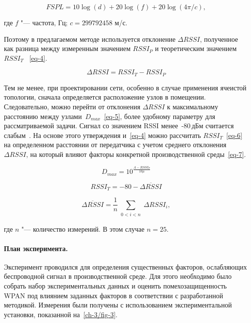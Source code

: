 \begin{equation}
	FSPL = 10 \log (d) +20 \log (f) +20 \log (4 \pi/c),
	\label{eq-3}
\end{equation}

\noindent где $f$ "--- частота, Гц; $c = 299792458$ м/с.

Поэтому в предлагаемом методе используется отклонение $\Delta RSSI$, полученное как разница между измеренным значением $RSSI_P$ и теоретическим значением $RSSI_T$~ \cref{eq-4}.

\begin{equation}
	\Delta RSSI = RSSI_T-RSSI_P
	\label{eq-4}
\end{equation}

Тем не менее, при проектировании сети, особенно в случае применения ячеистой топологии, сначала определяется расположение узлов в помещении. Следовательно, можно перейти от отклонения $\Delta RSSI$ к максимальному расстоянию между узлами~$D_{max}$~\cref{eq-5}, более удобному параметру для рассматриваемой задачи. Сигнал со значением RSSI менее~-80\,дБм считается слабым~\cite{mob_sig}. На основе этого утверждения и~\cref{eq-4} можно рассчитать $RSSI_T$~\cref{eq-6} на определенном расстоянии от передатчика с учетом среднего отклонения $\Delta RSSI$, на который влияют факторы конкретной производственной среды~\cref{eq-7}.

\begin{equation}
	D_{max} = 10^\frac{A-RSSI_T}{10 \mu}
	\label{eq-5}
\end{equation}

\begin{equation}
	RSSI_T = -80-\overline{{\mathit \Delta} RSSI}
	\label{eq-6}
\end{equation}

\begin{equation}
	\overline{{\mathit \Delta} RSSI} = \frac1n \sum_{\substack{0 < i < n}}{\mathit\Delta} RSSI_i,
	\label{eq-7}
\end{equation}

\noindent где $n$ "--- количество измерений. В этом случае $n = 25$.

\paragraph{План эксперимента.}

Эксперимент проводился для определения существенных факторов, ослабляющих беспроводной сигнал в производственной среде. Для этого необходимо было собрать набор экспериментальных данных и оценить помехозащищенность WPAN под влиянием заданных факторов в соответствии с разработанной методикой.
Измерения были получены с использованием экспериментальной установки, показанной на~\cref{ch-3/fig-3}.

